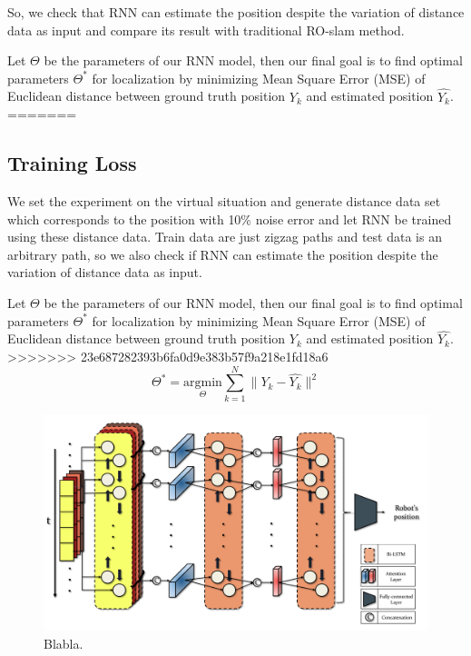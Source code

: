 \documentclass[letterpaper, 10 pt, conference]{ieeeconf}  %
\begin{document}
 So, we check that RNN can estimate the position despite the variation of distance data as input and compare its result with traditional RO-slam method.
 
 Let $\Theta$ be the parameters of our RNN model, then our final goal is to find optimal parameters $\Theta^{*}$ for localization by minimizing Mean Square Error (MSE) of Euclidean distance between ground truth position $Y_k$ and estimated position $\hat{Y_k}$.
=======
\subsection{Training Loss}

We set the experiment on the virtual situation and generate distance data set which corresponds to the position with 10\% noise error and let RNN be trained using these distance data. Train data are just zigzag paths and test data is an arbitrary path, so we also check if RNN can estimate the position despite the variation of distance data as input.

Let $\Theta$ be the parameters of our RNN model, then our final goal is to find optimal parameters $\Theta^{*}$ for localization by minimizing Mean Square Error (MSE) of Euclidean distance between ground truth position $Y_k$ and estimated position $\hat{Y_k}$.
>>>>>>> 23e687282393b6fa0d9e383b57f9a218e1fd18a6
\begin{equation}
\Theta^{*} = \underset{\Theta}{\mathrm{argmin}} \sum_{k=1}^N \parallel Y_k - \hat{Y_k} \parallel^{2}
\end{equation}  

\begin{figure}[t]
	
	\centering
	\includegraphics[height=10.2 cm]{CE554_networks}
	
	\label{fig:example}
	
	\caption{Blabla. }
	
\end{figure}
\end{document}
